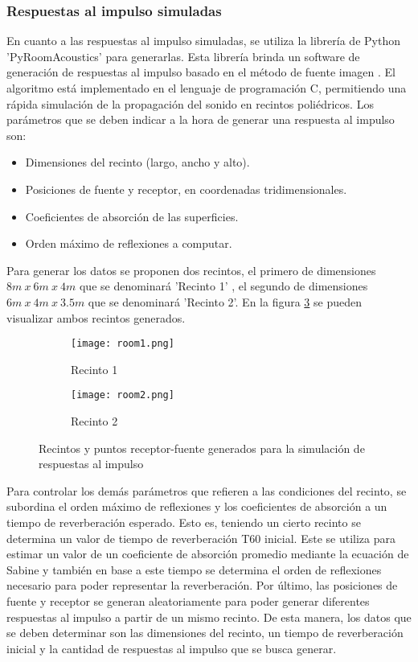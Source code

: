\subsubsection{Respuestas al impulso simuladas}

En cuanto a las respuestas al impulso simuladas, se utiliza la librería de Python 'PyRoomAcoustics' \cite{pyroom} para generarlas. Esta librería brinda un software de generación de respuestas al impulso basado en el método de fuente imagen  \cite{ISM}. El algoritmo está implementado en el lenguaje de programación C, permitiendo una rápida simulación de la propagación del sonido en recintos poliédricos. Los parámetros que se deben indicar a la hora de generar una respuesta al impulso son: 

\begin{itemize}
\item Dimensiones del recinto (largo, ancho y alto).
\item Posiciones de fuente y receptor, en coordenadas tridimensionales.
\item Coeficientes de absorción de las superficies.
\item Orden máximo de reflexiones a computar.
\end{itemize} 

Para generar los datos se proponen dos recintos, el primero de dimensiones $8m\: x\: 6m\: x\: 4m$ que se denominará 'Recinto 1' , el segundo de dimensiones $6m\: x\: 4m\: x\: 3.5m$ que se denominará 'Recinto 2'. En la figura \ref{fig:recintos} se pueden visualizar ambos recintos generados. 

\begin{figure}[H]
\centering
\begin{subfigure}{.5\textwidth}
  \centering
  \texttt{[image: room1.png]}
  \caption{Recinto 1}
  \label{fig:sub1}
\end{subfigure}%
\begin{subfigure}{.5\textwidth}
  \centering
  \texttt{[image: room2.png]}
  \caption{Recinto 2}
  \label{fig:sub2}
\end{subfigure}
\caption{Recintos y puntos receptor-fuente generados para la simulación de respuestas al impulso}
\label{fig:recintos}
\end{figure}

Para controlar los demás parámetros que refieren a las condiciones del recinto, se subordina el orden máximo de reflexiones y los coeficientes de absorción a un tiempo de reverberación esperado. Esto es, teniendo un cierto recinto se determina un valor de tiempo de reverberación T60 inicial. Este se utiliza para estimar un valor de un coeficiente de absorción promedio mediante la ecuación de Sabine y también en base a este tiempo se determina el orden de reflexiones necesario para poder representar la reverberación. 
Por último, las posiciones de fuente y receptor se generan aleatoriamente para poder generar diferentes respuestas al impulso a partir de un mismo recinto. De esta manera, los datos que se deben determinar son las dimensiones del recinto, un tiempo de reverberación inicial y la cantidad de respuestas al impulso que se busca generar. 

